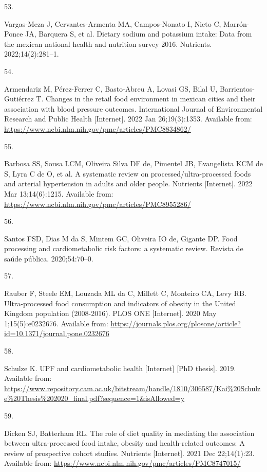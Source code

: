 \documentclass[
]{article}
\newlength{\cslhangindent}
\newlength{\csllabelwidth}
\newlength{\cslentryspacingunit} %
\newenvironment{CSLReferences}[2] %
 {%
  \setlength{\parindent}{0pt}
  \ifodd #1
  \let\oldpar\par
  \def\par{\hangindent=\cslhangindent\oldpar}
  \fi
  \setlength{\parskip}{#2\cslentryspacingunit}
 }%
 {}
\newcommand{\CSLLeftMargin}[1]{\parbox[t]{\csllabelwidth}{#1}}
\newcommand{\CSLRightInline}[1]{\parbox[t]{\linewidth - \csllabelwidth}{#1}\break}
\begin{document}
\begin{CSLReferences}{0}{0}
\leavevmode{}%
\CSLLeftMargin{53. }%
\CSLRightInline{Vargas-Meza J, Cervantes-Armenta MA, Campos-Nonato I,
Nieto C, Marrón-Ponce JA, Barquera S, et al. Dietary sodium and
potassium intake: {Data} from the mexican national health and nutrition
survey 2016. Nutrients. 2022;14(2):281--1. }

\leavevmode{}%
\CSLLeftMargin{54. }%
\CSLRightInline{Armendariz M, Pérez-Ferrer C, Basto-Abreu A, Lovasi GS,
Bilal U, Barrientos-Gutiérrez T. Changes in the retail food environment
in mexican cities and their association with blood pressure outcomes.
International Journal of Environmental Research and Public Health
{[}Internet{]}. 2022 Jan 26;19(3):1353. Available from:
\url{https://www.ncbi.nlm.nih.gov/pmc/articles/PMC8834862/}}

\leavevmode{}%
\CSLLeftMargin{55. }%
\CSLRightInline{Barbosa SS, Sousa LCM, Oliveira Silva DF de, Pimentel
JB, Evangelista KCM de S, Lyra C de O, et al. A systematic review on
processed/ultra-processed foods and arterial hypertension in adults and
older people. Nutrients {[}Internet{]}. 2022 Mar 13;14(6):1215.
Available from:
\url{https://www.ncbi.nlm.nih.gov/pmc/articles/PMC8955286/}}

\leavevmode{}%
\CSLLeftMargin{56. }%
\CSLRightInline{Santos FSD, Dias M da S, Mintem GC, Oliveira IO de,
Gigante DP. Food processing and cardiometabolic risk factors: a
systematic review. Revista de saúde pública. 2020;54:70--0. }

\leavevmode{}%
\CSLLeftMargin{57. }%
\CSLRightInline{Rauber F, Steele EM, Louzada ML da C, Millett C,
Monteiro CA, Levy RB. Ultra-processed food consumption and indicators of
obesity in the United Kingdom population (2008-2016). PLOS ONE
{[}Internet{]}. 2020 May 1;15(5):e0232676. Available from:
\url{https://journals.plos.org/plosone/article?id=10.1371/journal.pone.0232676}}

\leavevmode{}%
\CSLLeftMargin{58. }%
\CSLRightInline{Schulze K. UPF and cardiometabolic health {[}Internet{]}
{[}PhD thesis{]}. 2019. Available from:
\url{https://www.repository.cam.ac.uk/bitstream/handle/1810/306587/Kai\%20Schulze\%20Thesis\%202020_final.pdf?sequence=1\&isAllowed=y}}

\leavevmode{}%
\CSLLeftMargin{59. }%
\CSLRightInline{Dicken SJ, Batterham RL. The role of diet quality in
mediating the association between ultra-processed food intake, obesity
and health-related outcomes: A review of prospective cohort studies.
Nutrients {[}Internet{]}. 2021 Dec 22;14(1):23. Available from:
\url{https://www.ncbi.nlm.nih.gov/pmc/articles/PMC8747015/}}


\end{CSLReferences}
\end{document}
